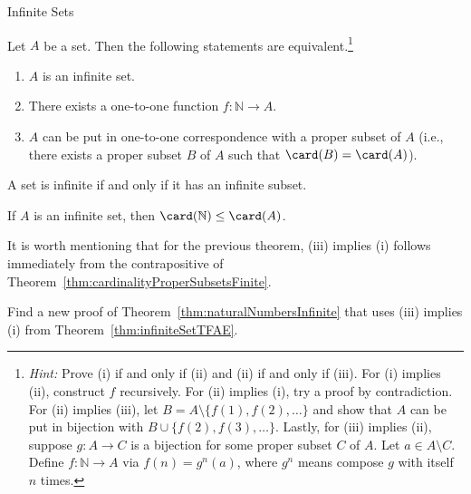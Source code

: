 \begin{section}{Infinite Sets}
\begin{theorem}\label{thm:infiniteSetTFAE}
Let $A$ be a set. Then the following statements are equivalent.\footnote{\emph{Hint:} Prove (i) if and only if (ii) and (ii) if and only if (iii). For (i) implies (ii), construct $f$ recursively. For (ii) implies (i), try a proof by contradiction. For (ii) implies (iii), let $B=A\setminus \{f(1),f(2),\ldots\}$ and show that $A$ can be put in bijection with $B\cup\{f(2),f(3),\ldots\}$. Lastly, for (iii) implies (ii), suppose $g:A\to C$ is a bijection for some proper subset $C$ of $A$. Let $a\in A\setminus C$. Define $f:\mathbb{N}\to A$ via $f(n)=g^n(a)$, where $g^n$ means compose $g$ with itself $n$ times.}
\begin{enumerate}[label=\textrm{(\roman*)}]
\item $A$ is an infinite set.
\item There exists a one-to-one function $f:\mathbb{N}\to A$.
\item $A$ can be put in one-to-one correspondence with a proper subset of $A$ (i.e., there exists a proper subset $B$ of $A$ such that $\card(B)=\card(A)$).
\end{enumerate}
\end{theorem}

\begin{corollary}\label{cor:infiniteSetInfiniteSubset}
A set is infinite if and only if it has an infinite subset.
\end{corollary}

\begin{corollary}
If $A$ is an infinite set, then $\card(\mathbb{N})\leq \card(A)$.
\end{corollary}

It is worth mentioning that for the previous theorem, (iii) implies (i) follows immediately from the contrapositive of Theorem~\ref{thm:cardinalityProperSubsetsFinite}.

\begin{problem}
Find a new proof of Theorem~\ref{thm:naturalNumbersInfinite} that uses (iii) implies (i) from Theorem~\ref{thm:infiniteSetTFAE}.
\end{problem}


\end{section}
